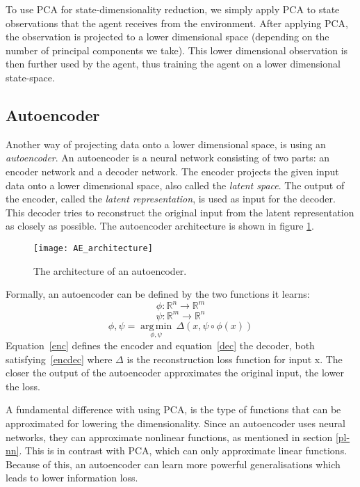 To use PCA for state-dimensionality reduction, we simply apply PCA to state observations that the agent receives from the environment. After applying PCA, the observation is projected to a lower dimensional space (depending on the number of principal components we take). This lower dimensional observation is then further used by the agent, thus training the agent on a lower dimensional state-space.

\subsection{Autoencoder}\label{pl-ae}
Another way of projecting data onto a lower dimensional space, is using an \emph{autoencoder}\cite{AE_general}. An autoencoder is a neural network consisting of two parts: an encoder network and a decoder network. The encoder projects the given input data onto a lower dimensional space, also called the \emph{latent space}. The output of the encoder, called the \emph{latent representation}, is used as input for the decoder. This decoder tries to reconstruct the original input from the latent representation as closely as possible. The autoencoder architecture is shown in figure \ref{fig:AE_architecture}.

\begin{figure}[h]
    \centering
    \texttt{[image: AE\_architecture]}
    \caption{The architecture of an autoencoder.}
    \label{fig:AE_architecture}
\end{figure}

Formally, an autoencoder can be defined by the two functions it learns: 
\begin{equation}
  \label{enc}
  \phi :{\mathbb{R}^n}\rightarrow {\mathbb{R}^m}
\end{equation}
\begin{equation}
  \label{dec}
  \psi :{\mathbb{R}^m}\rightarrow {\mathbb{R}^n}
\end{equation}
\begin{equation}
  \label{encdec}
  \phi ,\psi ={\underset {\phi ,\psi }{\operatorname {arg\,min} }}\,{\Delta}(x, \psi \circ \phi (x))
\end{equation}
Equation~\eqref{enc} defines the encoder and equation~\eqref{dec} the decoder, both satisfying~\eqref{encdec} where $\Delta$ is the reconstruction loss function for input x. The closer the output of the autoencoder approximates the original input, the lower the loss.

A fundamental difference with using PCA, is the type of functions that can be approximated for lowering the dimensionality. Since an autoencoder uses neural networks, they can approximate nonlinear functions, as mentioned in section \ref{pl-nn}. This is in contrast with PCA, which can only approximate linear functions. Because of this, an autoencoder can learn more powerful generalisations which leads to lower information loss\cite{AE_general}.

